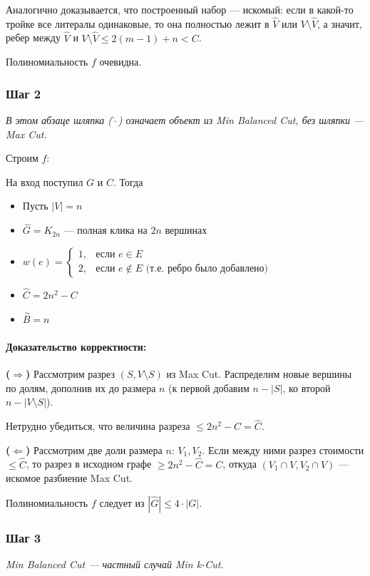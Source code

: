 \documentclass[12pt,a4paper]{article}
\begin{document}
Аналогично доказывается, что построенный набор --- искомый: если в какой-то тройке все литералы одинаковые, то она полностью лежит в $\hat{V}$ или $V \setminus \hat{V}$, а значит, ребер между $\hat{V}$ и $V \setminus \hat{V} \le 2(m - 1) + n < C$.

Полиномиальность $f$ очевидна.

\subsubsection*{Шаг 2}
\textit{В этом абзаце шляпка ($\hat{\cdot}$) означает объект из Min Balanced Cut, без шляпки --- Max Cut.}

Строим $f$:

На вход поступил $G$ и $C$. Тогда
\begin{itemize}
    \item Пусть $|V| = n$
    \item $\hat{G} = K_{2n}$ --- полная клика на $2n$ вершинах
    \item $w(e) = \begin{cases}
        1, & \text{если } e \in E \\
        2, & \text{если } e \notin E \text{ (т.е. ребро было добавлено)}
    \end{cases}$
    \item $\hat{C} = 2n^2 - C$
    \item $\hat{B} = n$
\end{itemize}

\paragraph{Доказательство корректности:}

\textbf{($\Rightarrow$)} Рассмотрим разрез $(S, V \setminus S)$ из Max Cut. Распределим новые вершины по долям, дополнив их до размера $n$ (к первой добавим $n - |S|$, ко второй $n - |V \setminus S|$).

Нетрудно убедиться, что величина разреза $\le 2n^2 - C = \hat{C}$.

\textbf{($\Leftarrow$)} Рассмотрим две доли размера $n$: $V_1, V_2$. Если между ними разрез стоимости $\le \hat{C}$, то разрез в исходном графе $\ge 2n^2 - \hat{C} = C$, откуда $(V_1 \cap V, V_2 \cap V)$ --- искомое разбиение Max Cut.

Полиномиальность $f$ следует из $|\hat{G}| \le 4 \cdot |G|$.

\subsubsection*{Шаг 3}
\textit{Min Balanced Cut --- частный случай Min k-Cut.}
\end{document}
